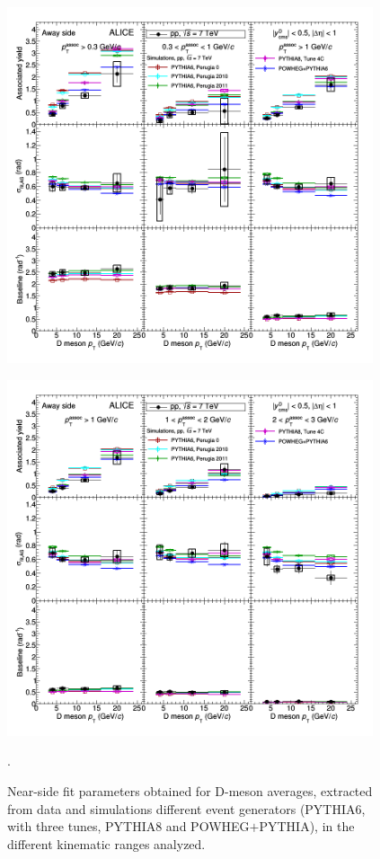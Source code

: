 \begin{figure}[h]
\centering
\includegraphics[width=0.96\textwidth]{figures/CfrPPandModels/ComparePPtoMCFitResultsAS.png}
\end{figure}
\begin{figure}[h]
\centering
\includegraphics[width=0.96\textwidth]{figures/CfrPPandModels/ComparePPtoMCFitResultsAS_2.png}
\caption{Near-side fit parameters obtained for D-meson averages, extracted from data and simulations different event generators (PYTHIA6, with three tunes, PYTHIA8 and POWHEG$+$PYTHIA), in the different kinematic ranges analyzed.}.
\label{fig:pp-modelsfitas}
\end{figure}

